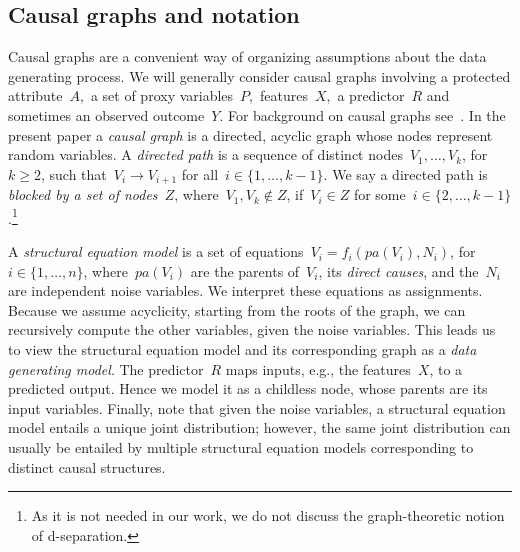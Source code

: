 \subsection{Causal graphs and notation}

Causal graphs are a convenient way of organizing assumptions about the data
generating process. We will generally consider causal graphs involving a
protected attribute~$A,$ a set of proxy variables~$P,$ features~$X,$ a
predictor~$R$ and sometimes an observed outcome~$Y.$ For background on causal
graphs see~\cite{Pearl2009}. In the present paper a \emph{causal graph} is a
directed, acyclic graph whose nodes represent random variables. A \emph{directed
path} is a sequence of distinct nodes~$V_1, \dots, V_k$, for~$k \ge 2$, such
that~$V_i \to V_{i+1}$ for all~$i \in \{1, \dots,k-1\}$. We say a directed path
is \emph{blocked by a set of nodes~$Z$}, where~$V_1, V_k \notin Z$, if~$V_i \in
Z$ for some~$i \in \{2, \dots, k-1 \}$.\footnote{As it is not needed in our
work, we do not discuss the graph-theoretic notion of d-separation.}

A \emph{structural equation model} is a set of equations~$V_i = f_i(pa(V_i),
N_i)$, for~$i \in \{1, \dots, n\}$, where~$pa(V_i)$ are the parents of~$V_i$,
\ie{} its \emph{direct causes}, and the~$N_i$ are independent noise variables. We interpret
these equations as assignments. Because we assume acyclicity, starting from the
roots of the graph, we can recursively compute the other variables, given the
noise variables. This leads us to view the structural equation model and its
corresponding graph as a \emph{data generating model}. The predictor~$R$ maps
inputs, e.g., the features~$X$, to a predicted output. Hence we model it as a
childless node, whose parents are its input variables. Finally, note that given
the noise variables, a structural equation model entails a unique joint
distribution; however, the same joint distribution can usually be entailed by
multiple structural equation models corresponding to distinct causal structures.
